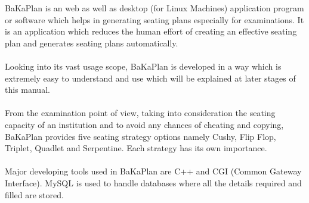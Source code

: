 

BaKaPlan is an web as well as desktop (for Linux Machines) application
program or software which helps in generating seating plans especially 
for examinations. It is an application which reduces the human effort 
of creating an effective seating plan and  generates seating plans 
automatically.\\\\
Looking into its vast usage scope, BaKaPlan is developed in a way which 
is extremely easy to understand and use which will be explained at later
stages of this manual.\\\\
From the examination point of view, taking into consideration the seating 
capacity of an institution and to avoid any chances of cheating and 
copying, BaKaPlan provides five seating strategy options namely Cushy,
Flip Flop, Triplet, Quadlet and Serpentine. Each strategy has its own importance.\\\\
Major developing tools used in BaKaPlan are C++ and CGI (Common Gateway
Interface). MySQL is used to handle databases where all the details required
and filled are stored.

